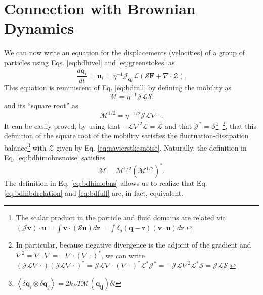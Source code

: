 \documentclass[ twoside,openright,titlepage,numbers=noenddot,%
headinclude,footinclude,cleardoublepage=empty,abstract=on,
BCOR=5mm,paper=b5,fontsize=11pt, dvipsnames
]{scrreprt}
\renewcommand{\vec}[1]{\bm{#1}}
\newcommand{\tens}[1]{\bm{\mathcal{#1}}}
\newcommand{\oper}[1]{\mathcal{#1}}
\newcommand{\dt}{\delta t}
\newcommand{\kT}{k_B T}
\newcommand{\ppos}{q}
\newcommand{\pvel}{u}
\newcommand{\fpos}{r}
\newcommand{\fvel}{v}
\begin{document}
\section{Connection with Brownian Dynamics}\label{sec:bdhicon}

We can now write an equation for the displacements (velocities) of a group of particles using Eqs. \eqref{eq:bdhivel} and \eqref{eq:greenstokes} as
\begin{equation}
  \label{eq:bdhibdrelation}
  \frac{d\vec{q}_i}{dt} = \vec{u}_i = \eta^{-1}\oper{J}_{\vec{\ppos}_i}\oper{L}(\oper{S}\vec{F} + \nabla\cdot\mathcal Z).
\end{equation}
This equation is reminiscent of Eq. \eqref{eq:bdfull} by defining the mobility as
\begin{equation}
  \label{eq:bdhimobns}
  \tens{M} = \eta^{-1}\oper{J}\oper{L}\oper{S}.
\end{equation}
and its ``square root'' as
\begin{equation}
  \label{eq:bdhimobnsnoise}
  \tens{M}^{1/2} = \eta^{-1/2}\oper{J}\oper{L}\nabla\cdot.
\end{equation}
It can be easily proved, by using that $-\oper{L}\nabla^2\oper{L} = \oper{L}$ and that $\oper{J}^*=\oper{S}$\footnote{The scalar product in the particle and fluid domains are related via $(\oper{J}\vec{\fvel})\cdot\vec{\pvel} = \int{\vec{\fvel}\cdot(\oper{S}\vec{\pvel})d\vec{r}} = \int{\delta_a(\vec{\ppos}-\vec{\fpos})(\vec{\fvel}\cdot\vec{\pvel})d\vec{r}}$.}~\cite{Delong2014}\footnote{In particular, because negative divergence is the adjoint of the gradient and $\nabla^2 = \nabla\cdot\nabla = -\nabla\cdot(\nabla\cdot)^*$, we can write $\left(\oper{J}\oper{L}\nabla\cdot\right)\left(\oper{J}\oper{L}\nabla\cdot\right)^* = \oper{J}\oper{L}\nabla\cdot(\nabla\cdot)^*\oper{L}^*\oper{J}^* = -\oper{J}\oper{L}\nabla^2\oper{L}^*\oper{S} = \oper{J}\oper{L}\oper{S}$.}, that this definition of the square root of the mobility satisfies the fluctuation-dissipation balance\footnote{$\left\langle\delta\vec{\ppos}_i\otimes\delta\vec{\ppos}_j\right\rangle = 2\kT\tens{M}(\vec{\ppos_{ij}})\dt$} with $\mathcal{Z}$ given by Eq. \eqref{eq:navierstkesnoise}.
Naturally, the definition in Eq. \eqref{eq:bdhimobnsnoise} satisfies
\begin{equation}
  \label{eq:mobsqrt}
  \tens{M} = \tens{M}^{1/2}\left(\tens{M}^{1/2}\right)^*.
\end{equation}
The definition in Eq. \ref{eq:bdhimobns} allows us to realize that Eq. \eqref{eq:bdhibdrelation} and \eqref{eq:bdfull} are, in fact, equivalent.
\end{document}
